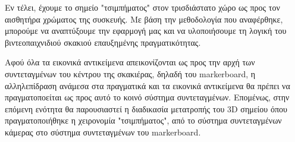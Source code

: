 Εν τέλει, έχουμε το σημείο "τσιμπήματος" στον τρισδιάστατο χώρο ως προς τον αισθητήρα χρώματος της συσκευής. Με βάση την μεθοδολογία που αναφέρθηκε, μπορούμε να αναπτύξουμε την εφαρμογή μας και να υλοποιήσουμε τη λογική του βιντεοπαιχνιδιού σκακιού επαυξημένης πραγματικότητας. 


Αφού όλα τα εικονικά αντικείμενα απεικονίζονται ως προς την αρχή των συντεταγμένων του κέντρου της σκακιέρας, δηλαδή του markerboard, η αλληλεπίδραση ανάμεσα στα πραγματικά και τα εικονικά αντικείμενα θα πρέπει να πραγματοποείται ως προς αυτό το κοινό σύστημα συντεταγμένων. Επομένως, στην επόμενη ενότητα θα παρουσιαστεί η διαδικασία μετατροπής του 3D σημείου όπου πραγματοποιήθηκε η χειρονομία "τσιμπήματος", από το σύστημα συντεταγμένων κάμερας στο σύστημα συντεταγμένων του markerboard.








